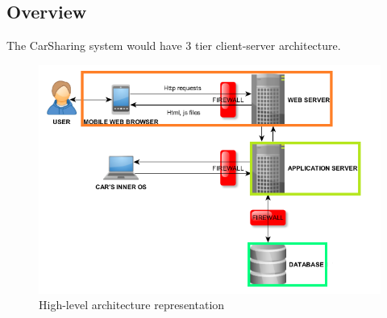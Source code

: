 \documentclass[12pt, letterpaper]{article}
\begin{document}
\subsection{Overview}

The CarSharing system would have 3 tier client-server architecture. 

\begin{figure}[H]
\centering
\includegraphics[width=\textwidth]{hlarch.png}
\caption{High-level architecture representation}
\label{fig:hlarch}
\end{figure}
\end{document}

